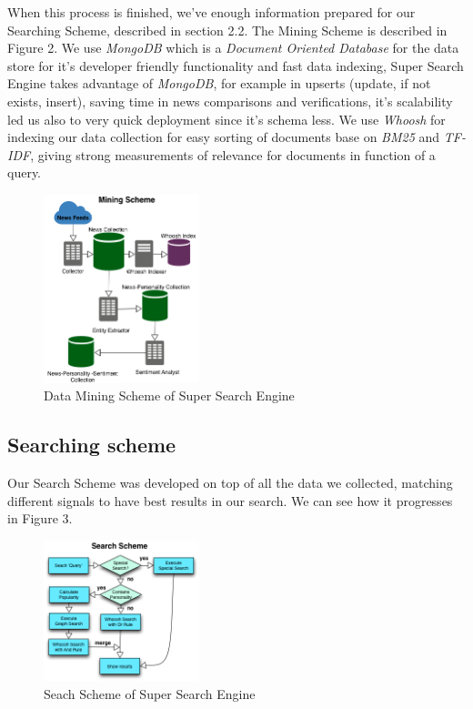 \documentclass{acm_proc_article-sp}
\begin{document}
When this process is finished, we've enough information prepared for our Searching Scheme, described in section 2.2. The Mining Scheme is described in Figure 2.
We use \textit{MongoDB} which is a \textit{Document Oriented Database} for the data store for it's developer friendly functionality and fast data indexing, Super Search Engine takes advantage of \textit{MongoDB}, for example in upserts (update, if not exists, insert), saving time in news comparisons and verifications, it's scalability led us also to very quick deployment since it's schema less.
We use \textit{Whoosh} for indexing our data collection for easy sorting of documents base on \textit{BM25} and \textit{TF-IDF}, giving strong measurements of relevance for documents in function of a query.

	\begin{figure}[h]
   	\centering
   	\includegraphics[width=0.40\textwidth]{MiningScheme.png}
   	\caption{Data Mining Scheme of Super Search Engine}
	\end{figure}


\subsection{Searching scheme}

Our Search Scheme was developed on top of all the data we collected, matching different signals to have best results in our search. We can see how it progresses in Figure 3.

	\begin{figure}[h]
   	\centering
   	\includegraphics[width=0.40\textwidth]{SearchScheme.png}
   	\caption{Seach Scheme of Super Search Engine}
	\end{figure}
\end{document}
